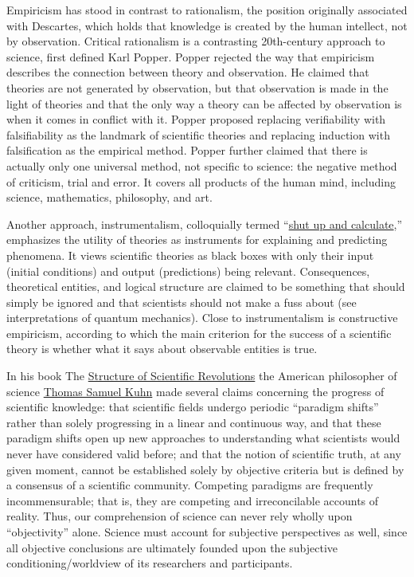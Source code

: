 Empiricism has stood in contrast to rationalism, the position originally associated with Descartes, which holds that knowledge is created by the human intellect, not by observation. Critical rationalism is a contrasting 20th-century approach to science, first defined Karl Popper. Popper rejected the way that empiricism describes the connection between theory and observation. He claimed that theories are not generated by observation, but that observation is made in the light of theories and that the only way a theory can be affected by observation is when it comes in conflict with it. Popper proposed replacing verifiability with falsifiability as the landmark of scientific theories and replacing induction with falsification as the empirical method. Popper further claimed that there is actually only one universal method, not specific to science: the negative method of criticism, trial and error. It covers all products of the human mind, including science, mathematics, philosophy, and art.

Another approach, instrumentalism, colloquially termed ``\href{https://physicstoday.scitation.org/doi/10.1063/1.1768652}{shut up and calculate},'' emphasizes the utility of theories as instruments for explaining and predicting phenomena. It views scientific theories as black boxes with only their input (initial conditions) and output (predictions) being relevant. Consequences, theoretical entities, and logical structure are claimed to be something that should simply be ignored and that scientists should not make a fuss about (see interpretations of quantum mechanics). Close to instrumentalism is constructive empiricism, according to which the main criterion for the success of a scientific theory is whether what it says about observable entities is true.

In his book The \href{https://en.wikipedia.org/wiki/The_Structure_of_Scientific_Revolutions}{Structure of Scientific Revolutions} the American philosopher of science \href{https://en.wikipedia.org/wiki/Thomas_Kuhn}{Thomas Samuel Kuhn} made several claims concerning the progress of scientific knowledge: that scientific fields undergo periodic ``paradigm shifts'' rather than solely progressing in a linear and continuous way, and that these paradigm shifts open up new approaches to understanding what scientists would never have considered valid before; and that the notion of scientific truth, at any given moment, cannot be established solely by objective criteria but is defined by a consensus of a scientific community. Competing paradigms are frequently incommensurable; that is, they are competing and irreconcilable accounts of reality. Thus, our comprehension of science can never rely wholly upon ``objectivity'' alone. Science must account for subjective perspectives as well, since all objective conclusions are ultimately founded upon the subjective conditioning/worldview of its researchers and participants.

